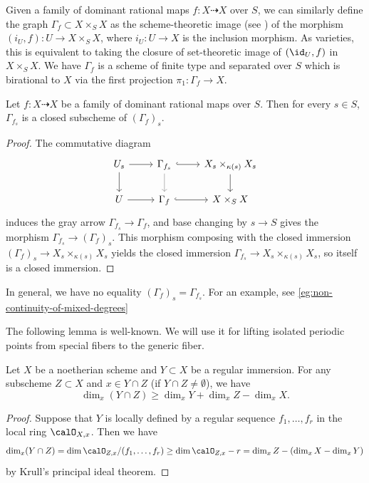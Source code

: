   Given a family of dominant rational maps $f: X \dashrightarrow X$ over $S$, we can similarly define the graph $\Gamma_f \subset X \times_S X$ as the scheme-theoretic image (see \cite[Tag 01R5]{Stacks}) of the morphism $(i_U, f): U \to X \times_S X$, where $i_U: U \to X$ is the inclusion morphism.
  As varieties, this is equivalent to taking the closure of set-theoretic image of $(\id_U, f)$ in $X \times_S X$.
  We have $\Gamma_f$ is a scheme of finite type and separated over $S$ which is birational to $X$ via the first projection $\pi_1: \Gamma_f \to X$.

  \begin{proposition}
    Let $f: X \dashrightarrow X$ be a family of dominant rational maps over $S$.
    Then for every $s \in S$, $\Gamma_{f_s}$ is a closed subscheme of $(\Gamma_f)_s$.
  \end{proposition}
  \begin{proof}
    The commutative diagram 
    \[
      \begin{tikzcd}
        U_s \ar[r] \ar[d] & \Gamma_{f_s} \ar[r, hook] \ar[d,gray] & X_s \times_{\kappa(s)} X_s \ar[d] \\
        U \ar[r] & \Gamma_f \ar[r, hook] & X \times_S X
      \end{tikzcd}
    \]
    induces the gray arrow $\Gamma_{f_s} \to \Gamma_f$, and base changing by $s \to S$ gives the morphism $\Gamma_{f_s} \to (\Gamma_f)_s$.
    This morphism composing with the closed immersion $(\Gamma_f)_s \to X_s \times_{\kappa(s)} X_s$ yields the closed immersion $\Gamma_{f_s} \to X_s \times_{\kappa(s)} X_s$, so itself is a closed immersion.
  \end{proof}

  \begin{remark}
    In general, we have no equality $(\Gamma_f)_s = \Gamma_{f_s}$.
    For an example, see \cref{eg:non-continuity-of-mixed-degrees}
  \end{remark}

  The following lemma is well-known.
  We will use it for lifting isolated periodic points from special fibers to the generic fiber.
  \begin{lemma}\label{lem:intersection_dimension_estimate}
    Let $X$ be a noetherian scheme and $Y \subset X$ be a regular immersion.
    For any subscheme $Z \subset X$ and $x \in Y \cap Z$ (if $Y \cap Z \neq \emptyset$), we have 
    \[ \dim_x (Y \cap Z) \geq \dim_x Y + \dim_x Z - \dim_x X. \]
  \end{lemma}
  \begin{proof}
    Suppose that $Y$ is locally defined by a regular sequence $f_1, \dots, f_r$ in the local ring $\calO_{X,x}$.
    Then we have
    \[ \dim_x (Y \cap Z) = \dim \calO_{Z,x} / (f_1, \dots, f_r) \geq \dim \calO_{Z,x} - r = \dim_x Z - (\dim_x X - \dim_x Y) \]
    by Krull's principal ideal theorem.
  \end{proof}
  
